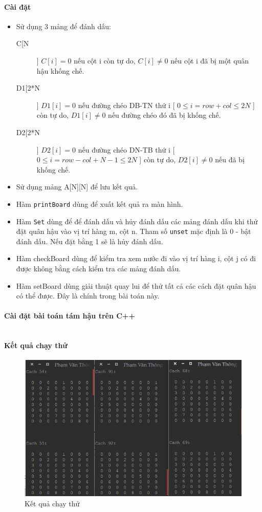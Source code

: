 \documentclass[8pt, a4paper]{article}
\newcommand{\mnt}[1]{\inputminted[frame=single, linenos=true, tabsize=4]{c++}{#1}}
\begin{document}
\paragraph{Cài đặt}
\begin{itemize}
\item Sử dụng 3 mảng để đánh dấu:
\begin{description}
\item [C[N]] $C[i] = 0$ nếu cột i còn tự do, $C[i] \neq 0$ nếu cột i đã bị một quân hậu khống chế.
\item [D1[2*N]] $D1[i] = 0$ nếu đường chéo DB-TN thứ i [ $0 \le i = row + col \le 2N$ ] còn tự do, $D1[i] \neq 0$ nếu đường chéo đó đã bị khống chế.
\item [D2[2*N]] $D2[i] = 0$ nếu đường chéo DN-TB thứ i [ $0 \le i = row - col + N - 1 \le 2N$ ] còn tự do, $D2[i] \neq 0$ nếu đã bị khống chế.
\end{description}
\item Sử dụng mảng A[N][N] để lưu kết quả.
\item Hàm \texttt{printBoard} dùng để xuất kết quả ra màn hình.
\item Hàm \texttt{Set} dùng để để đánh dấu và hủy đánh dấu các mảng đánh dấu khi thử đặt quân hậu vào vị trí hàng m, cột n. Tham số \texttt{unset} mặc định là 0 - bật đánh dấu. Nếu đặt bằng 1 sẽ là hủy đánh dấu.
\item Hàm checkBoard dùng để kiểm tra xem nước đi vào vị trí hàng i, cột j có đi được không bằng cách kiểm tra các mảng đánh dấu.
\item Hàm setBoard dùng giải thuật quay lui để thử tất cả các cách đặt quân hậu có thể được. Đây là chính trong bài toán này.
\end{itemize}

\paragraph {Cài đặt bài toán tám hậu trên C++}

\mnt{src/queen.cpp}

\paragraph {Kết quả chạy thử}
\begin{figure}[htp]
\centering
\includegraphics[scale=0.50]{img/queen.png}
\caption{Kết quả chạy thử}
\label{}
\end{figure}
\end{document}
